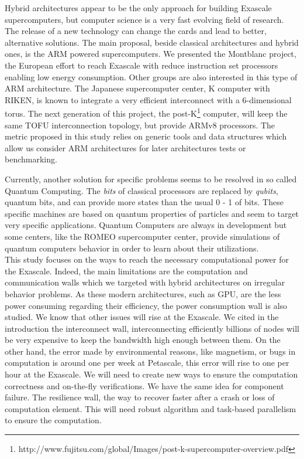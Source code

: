 Hybrid architectures appear to be the only approach for building Exascale supercomputers, but computer science is a very fast evolving field of research.  
The release of a new technology can change the cards and lead to better, alternative solutions.
The main proposal, beside classical architectures and hybrid ones, is the ARM powered supercomputers. 
We presented the Montblanc project, the European effort to reach Exascale with reduce instruction set processors enabling low energy consumption. 
Other groups are also interested in this type of ARM architecture. 
The Japanese supercomputer center, K computer with RIKEN, is known to integrate a very efficient interconnect with a 6-dimensional torus.
The next generation of this project, the post-K\footnote{http://www.fujitsu.com/global/Images/post-k-supercomputer-overview.pdf} computer, will keep the same TOFU interconnection topology, but provide ARMv8 processors. 
The metric proposed in this study relies on generic tools and data structures which allow us consider ARM architectures for later architectures tests or benchmarking.

Currently, another solution for specific problems seems to be resolved in so called Quantum Computing.
The \textit{bits} of classical processors are replaced by \textit{qubits}, quantum bits, and can provide more states than the usual 0 - 1 of bits.
These specific machines are based on quantum properties of particles and seem to target very specific applications. 
Quantum Computers are always in development but some centers, like the ROMEO supercomputer center, provide simulations of quantum computers behavior in order to learn about their utilizations.\\

This study focuses on the ways to reach the necessary computational power for the Exascale. 
Indeed, the main limitations are the computation and communication walls which we targeted with hybrid architectures on irregular behavior problems. 
As these modern architectures, such as GPU, are the less power consuming regarding their efficiency, the power consumption wall is also studied. 
We know that other issues will rise at the Exascale. 
We cited in the introduction the interconnect wall, interconnecting efficiently billions of nodes will be very expensive to keep the bandwidth high enough between them.
On the other hand, the error made by environmental reasons, like magnetism, or bugs in computation is around one per week at Petascale, this error will rise to one per hour at the Exascale. 
We will need to create new ways to ensure the computation correctness and on-the-fly verifications.
We have the same idea for component failure.
The resilience wall, the way to recover faster after a crash or loss of computation element.
This will need robust algorithm and task-based parallelism to ensure the computation.


